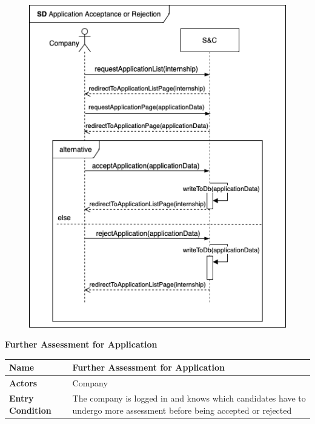 \begin{enumerate}[label=\textbf{[US\arabic*]}, left = 0pt, align = left, resume]
\newpage
            \begin{figure}[h!]
                \centering        \includegraphics{RASD/Images/UseCases/ApplicationAcceptanceRejection.drawio.png}
                \label{fig:example}
                \end{figure}
\newpage

 \item \textbf{Further Assessment for Application}
            
            \begin{longtable}{|l|p{11cm}|}  
                \hline
                \textbf{Name} & 
                    \textbf{Further Assessment for Application} \\
                \hline
                
                \textbf{Actors} & 
                    Company\\
                \hline
                
                \textbf{Entry Condition} & 
                    The company is logged in and knows which candidates have to undergo more assessment before being accepted or rejected \\
                \hline
                

\end{longtable}
\end{enumerate}
